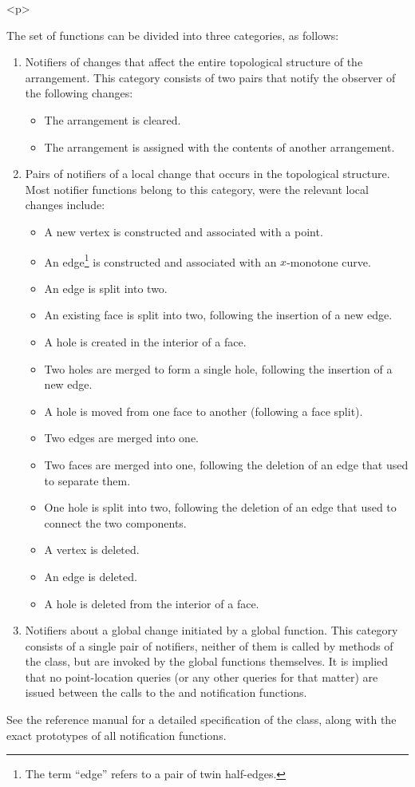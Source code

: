 \begin{ccHtmlOnly}<p>\end{ccHtmlOnly}
The set of functions can be divided into three categories, as
follows:
\begin{enumerate}
\item Notifiers of changes that affect the entire topological structure
of the arrangement. This category consists of two pairs that
notify the observer of the following changes:
\begin{itemize}
\item The arrangement is cleared.
\item The arrangement is assigned with the contents of another
arrangement.
\end{itemize}
\item Pairs of notifiers of a local change that occurs in the
topological structure. Most notifier functions belong to this
category, were the relevant local changes include:
\begin{itemize}
\item A new vertex is constructed and associated with a point.
\item An edge\footnote{The term ``edge'' refers to a pair of twin
half-edges.} is constructed and associated with an $x$-monotone
curve.
\item An edge is split into two.
\item An existing face is split into two, following the insertion of a
new edge.
\item A hole is created in the interior of a face.
\item Two holes are merged to form a single hole, following the
insertion of a new edge.
\item A hole is moved from one face to another (following a face split).
\item Two edges are merged into one.
\item Two faces are merged into one, following the deletion of an edge
that used to separate them.
\item One hole is split into two, following the deletion of an edge that
used to connect the two components.
\item A vertex is deleted.
\item An edge is deleted.
\item A hole is deleted from the interior of a face.
\end{itemize}
\item Notifiers about a global change initiated by a global function.
This category consists of a single pair of notifiers, neither of
them is called by methods of the  class, but
are invoked by the global functions themselves. It is implied that
no point-location queries (or any other queries for that matter)
are issued between the calls to the 
and  notification functions.
\end{enumerate}
See the reference manual for a detailed specification of the
 class, along with the exact prototypes of all
notification functions.


